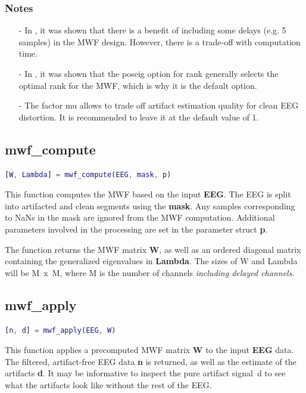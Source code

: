 \documentclass[11pt]{article}
\begin{document}
\subsubsection{Notes}

\begin{itemize}[noitemsep]
\item[-] In \cite{somers2018generic}, it was shown that there is a benefit of including some delays (e.g. 5 samples) in the MWF design. However, there is a trade-off with computation time.
\item[-] In \cite{somers2018generic}, it was shown that the poseig option for rank generally selects the optimal rank for the MWF, which is why it is the default option.
\item[-] The factor mu allows to trade off artifact estimation quality for clean EEG distortion. It is recommended to leave it at the default value of 1.
\end{itemize}

\newpage
\subsection{mwf\_compute}
\label{mwfcompute}

\begin{lstlisting}[frame=single, language=matlab]
[W, Lambda] = mwf_compute(EEG, mask, p)
\end{lstlisting}

This function computes the MWF based on the input \textbf{EEG}. The EEG is split into artifacted and clean segments using the \textbf{mask}. Any samples corresponding to NaNs in the mask are ignored from the MWF computation. Additional parameters involved in the processing are set in the parameter struct \textbf{p}.

The function returns the MWF matrix \textbf{W}, as well as an ordered diagonal matrix containing the generalized eigenvalues in \textbf{Lambda}. The sizes of W and Lambda will be M~x~M, where M is the number of channels \emph{including delayed channels}. 

\subsection{mwf\_apply}

\begin{lstlisting}[frame=single, language=matlab]
[n, d] = mwf_apply(EEG, W)
\end{lstlisting}

This function applies a precomputed MWF matrix \textbf{W} to the input \textbf{EEG} data. The filtered, artifact-free EEG data \textbf{n} is returned, as well as the estimate of the artifacts \textbf{d}. It may be informative to inspect the pure artifact signal~d to see what the artifacts look like without the rest of the EEG.
\end{document}
